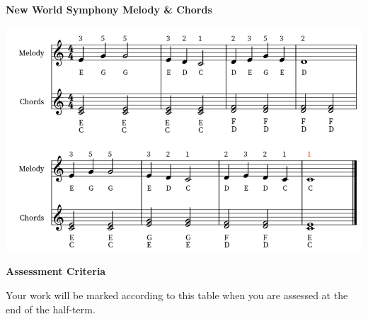 \documentclass{article}
\begin{document}
\begin{landscape}
\newpage
  \begin{center}
    \fontsize{18}{22}\selectfont
    \textbf{New World Symphony Melody \& Chords}
  \end{center}

  \begin{center}
    \includegraphics[width=0.9\linewidth, height=0.8\linewidth, keepaspectratio]{newworldscore.png}
  \end{center}


\end{landscape}

\newpage

\begin{center}
    \fontsize{18}{22}\selectfont
    \textbf{Assessment Criteria}
\end{center}

\vspace{1em}

\noindent Your work will be marked according to this table when you are assessed at the end of the half-term.

\vspace{1em}
\end{document}
